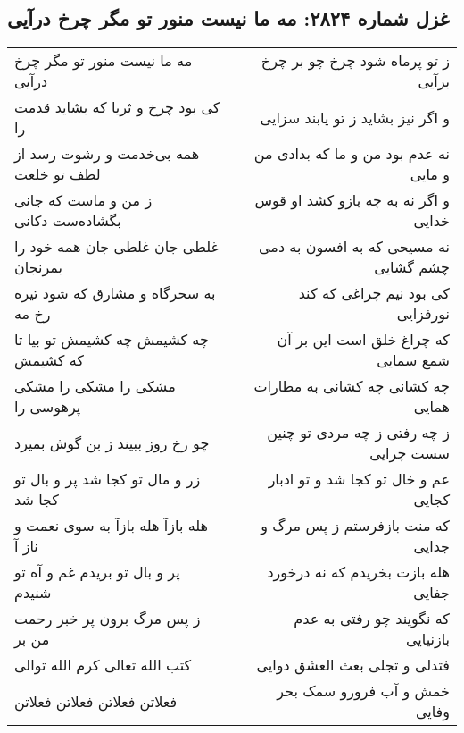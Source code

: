\begin{center}
\section*{غزل شماره ۲۸۲۴: مه ما نیست منور تو مگر چرخ درآیی}
\label{sec:2824}
\begin{longtable}{l p{0.5cm} r}
مه ما نیست منور تو مگر چرخ درآیی
&&
ز تو پرماه شود چرخ چو بر چرخ برآیی
\\
کی بود چرخ و ثریا که بشاید قدمت را
&&
و اگر نیز بشاید ز تو یابند سزایی
\\
همه بی‌خدمت و رشوت رسد از لطف تو خلعت
&&
نه عدم بود من و ما که بدادی من و مایی
\\
ز من و ماست که جانی بگشاده‌ست دکانی
&&
و اگر نه به چه بازو کشد او قوس خدایی
\\
غلطی جان غلطی جان همه خود را بمرنجان
&&
نه مسیحی که به افسون به دمی چشم گشایی
\\
به سحرگاه و مشارق که شود تیره رخ مه
&&
کی بود نیم چراغی که کند نورفزایی
\\
چه کشیمش چه کشیمش تو بیا تا که کشیمش
&&
که چراغ خلق است این بر آن شمع سمایی
\\
مشکی را مشکی را مشکی پرهوسی را
&&
چه کشانی چه کشانی به مطارات همایی
\\
چو رخ روز ببیند ز بن گوش بمیرد
&&
ز چه رفتی ز چه مردی تو چنین سست چرایی
\\
زر و مال تو کجا شد پر و بال تو کجا شد
&&
عم و خال تو کجا شد و تو ادبار کجایی
\\
هله بازآ هله بازآ به سوی نعمت و ناز آ
&&
که منت بازفرستم ز پس مرگ و جدایی
\\
پر و بال تو بریدم غم و آه تو شنیدم
&&
هله بازت بخریدم که نه درخورد جفایی
\\
ز پس مرگ برون پر خبر رحمت من بر
&&
که نگویند چو رفتی به عدم بازنیایی
\\
کتب الله تعالی کرم الله توالی
&&
فتدلی و تجلی بعث العشق دوایی
\\
فعلاتن فعلاتن فعلاتن فعلاتن
&&
خمش و آب فرورو سمک بحر وفایی
\\
\end{longtable}
\end{center}

